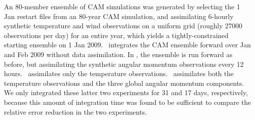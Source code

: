 An 80-member ensemble of CAM simulations was generated by selecting the 1 Jan restart files from an 80-year CAM simulation, and assimilating 6-hourly synthetic temperature and wind observations on a uniform grid (roughly 27000 observations per day) for an entire year, which yields a tightly-constrained starting ensemble on 1 Jan 2009.  
\NODA ~integrates the CAM ensemble forward over Jan and Feb 2009 without data assimilation. 
In \ERPALL, the ensemble is run forward as before, but assimilating the synthetic angular momentum observations every 12 hours.
\RST ~assimilates only the temperature observations.
\ERPRST ~assimilates both the temperature observations and the three global angular momentum components.
We only integrated these latter two experiments for 31 and 17 days, respectively, because this amount of integration time was found to be sufficient to compare the relative error reduction in the two experiments. 
